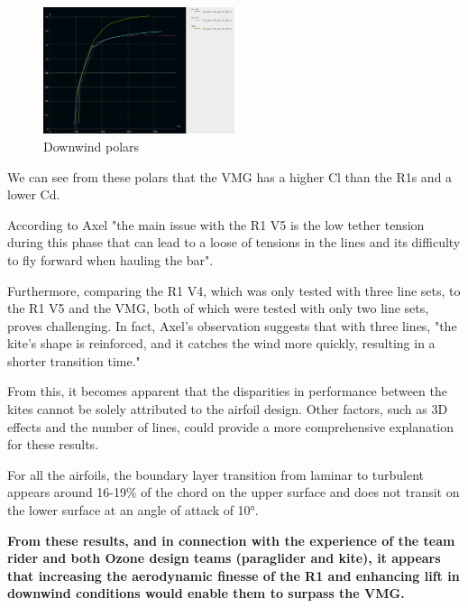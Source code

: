 \begin{figure}[H]
    \centering
    \includegraphics[width=0.5\textwidth]{figures/2D steady simulations/xflr5/Polar downwind.png}
    \caption{Downwind polars}
    \label{fig:Downwind_polars}
\end{figure}

We can see from these polars that the VMG has a higher Cl than the R1s and a lower Cd. 

According to Axel "the main issue with the R1 V5 is the low tether tension during this phase that can lead to a loose of tensions in the lines and its difficulty to fly forward when hauling the bar". 


Furthermore, comparing the R1 V4, which was only tested with three line sets, to the R1 V5 and the VMG, both of which were tested with only two line sets, proves challenging. In fact, Axel's observation suggests that with three lines, "the kite's shape is reinforced, and it catches the wind more quickly, resulting in a shorter transition time."

From this, it becomes apparent that the disparities in performance between the kites cannot be solely attributed to the airfoil design. Other factors, such as 3D effects and the number of lines, could provide a more comprehensive explanation for these results.

For all the airfoils, the boundary layer transition from laminar to turbulent appears around 16-19$\%$ of the chord on the upper surface and does not transit on the lower surface at an angle of attack of 10°. 

\textbf{From these results, and in connection with the experience of the team rider and both Ozone design teams (paraglider and kite), it appears that increasing the aerodynamic finesse of the R1 and enhancing lift in downwind conditions would enable them to surpass the VMG.}


